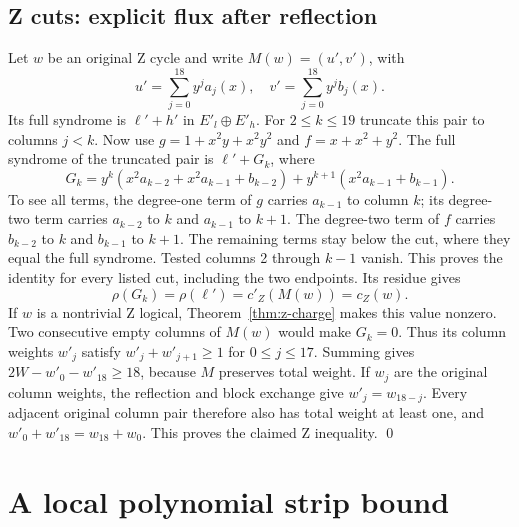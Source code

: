 \documentclass{article}
\begin{document}
\subsection{Z cuts: explicit flux after reflection}\label{sec:z-cuts}

Let \(w\) be an original Z cycle and write \(M(w)=(u',v')\), with
\begin{equation}
  u'=\sum_{j=0}^{18}y^ja_j(x), \quad
  v'=\sum_{j=0}^{18}y^jb_j(x).
\end{equation}
Its full syndrome is \(\ell'+h'\) in \(E'_l\oplus E'_h\).
For \(2\le k\le 19\) truncate this pair to columns \(j<k\).
Now use \(g=1+x^2y+x^2y^2\) and \(f=x+x^2+y^2\).
The full syndrome of the truncated pair is \(\ell'+G_k\), where
\begin{equation}
  G_k=y^k(x^2a_{k-2}+x^2a_{k-1}+b_{k-2})
  +y^{k+1}(x^2a_{k-1}+b_{k-1}).
\end{equation}
To see all terms, the degree-one term of \(g\) carries \(a_{k-1}\)
to column \(k\); its degree-two term carries \(a_{k-2}\) to \(k\)
and \(a_{k-1}\) to \(k+1\). The degree-two term of \(f\) carries
\(b_{k-2}\) to \(k\) and \(b_{k-1}\) to \(k+1\).
The remaining terms stay below the cut, where they equal the full
syndrome. Tested columns 2 through \(k-1\) vanish. This proves the
identity for every listed cut, including the two endpoints.
Its residue gives
\begin{equation}
  \rho(G_k)=\rho(\ell')=c'_Z(M(w))=c_Z(w).
\end{equation}
If \(w\) is a nontrivial Z logical, Theorem~\ref{thm:z-charge} makes this value
nonzero. Two consecutive empty columns of \(M(w)\) would make \(G_k=0\).
Thus its column weights \(w'_j\) satisfy
\(w'_j+w'_{j+1}\ge 1\) for \(0\le j\le 17\). Summing gives
\(2W-w'_0-w'_{18}\ge 18\), because \(M\) preserves total weight.
If \(w_j\) are the original column weights, the reflection and block
exchange give \(w'_j=w_{18-j}\). Every adjacent original column pair
therefore also has total weight at least one, and
\(w'_0+w'_{18}=w_{18}+w_0\). This proves the claimed Z inequality. \qed

\section{A local polynomial strip bound}\label{sec:strip}
\end{document}
